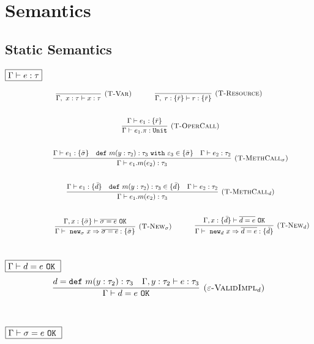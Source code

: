 \documentclass{llncs}
\newcommand{\keywadj}[1]{\mathtt{#1}}
\newcommand{\keyw}[1]{\keywadj{#1}~}
\begin{document}
\section{Semantics}

\subsection{Static Semantics}

\noindent
$\fbox{$\Gamma \vdash e : \tau$}$

\[
\begin{array}{c}
\infer[\textsc{(T-Var)}]
	{\Gamma,~x : \tau \vdash x : \tau}
	{}
~~~~~~~~~~
\infer[\textsc{(T-Resource)}]
	{\Gamma,~r : \{ \bar r \} \vdash r : \{ \bar r \}}
	{} \\[5ex]
~~~~~~~~~~
\infer[\textsc{(T-OperCall)}]
	{\Gamma \vdash e_1.\pi : \keywadj{Unit}}
	{\Gamma \vdash e_1 : \{ \bar r \}} \\[5ex]
~~~~~~~~~~
\infer[\textsc{(T-MethCall$_\sigma$)}]
	{\Gamma \vdash e_1.m(e_2) : \tau_3}
	{\Gamma \vdash e_1 : \{ \bar \sigma \} & \keyw{def} m(y : \tau_2) : \tau_3~\keyw{with} \varepsilon_3 \in \{ \bar \sigma \} &  \Gamma \vdash e_2 : \tau_2 }\\[5ex]
~~~~~~~~~~
\infer[\textsc{(T-MethCall$_d$)}]
	{\Gamma \vdash e_1.m(e_2) : \tau_3}
	{\Gamma \vdash e_1 : \{ \bar d\} & \keyw{def} m(y : \tau_2) : \tau_3 \in \{ \bar d \} &  \Gamma \vdash e_2 : \tau_2 }\\[5ex]
~~~~~~~~~~

~~~~~~~~~~
\infer[\textsc{(T-New$_\sigma$)}]
	{\Gamma \vdash~\keywadj{new}_\sigma~x \Rightarrow \overline{\sigma = e} : \{ \bar \sigma \}}
	{\Gamma, x : \{ \bar \sigma \} \vdash \overline{\sigma = e}~\keywadj{OK}}
~~~~~~~~~~
\infer[\textsc{(T-New$_d$)}]
	{\Gamma \vdash~\keywadj{new}_d~x \Rightarrow \overline{d = e} : \{ \bar d \}}
	{\Gamma, x : \{ \bar d \} \vdash \overline{d = e}~\keywadj{OK}}\\[5ex]
\end{array}
\]

\noindent
$\fbox{$\Gamma \vdash d = e~\keyw{OK}$}$
\[
\begin{array}{c}
\infer[\textsc{($\varepsilon$-ValidImpl$_d$)}]
	{\Gamma \vdash d = e~\keywadj{OK}}
	{d = \keyw{def} m(y : \tau_2) : \tau_3 & \Gamma, y : \tau_2 \vdash e : \tau_3}
	\\[5ex]
\end{array}
\]

\noindent
$\fbox{$\Gamma \vdash \sigma = e~\keyw{OK}$}$
\end{document}
